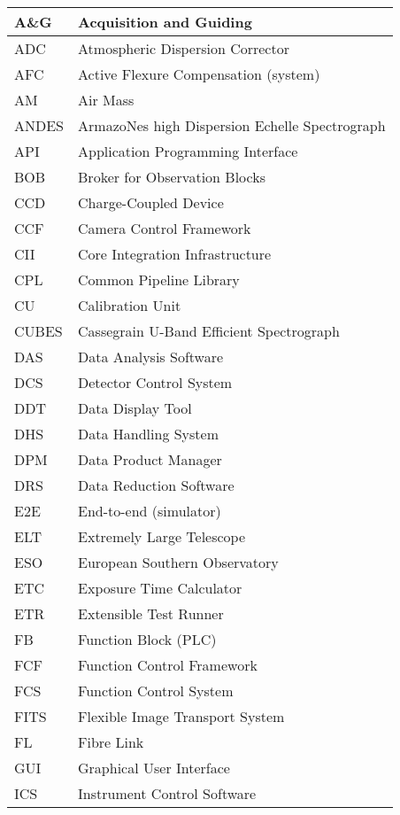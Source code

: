 \begin{longtable}{ |l|l| }
  \hline
A\&G & Acquisition and Guiding \\ \hline
ADC & Atmospheric Dispersion Corrector \\ \hline
AFC & Active Flexure Compensation (system) \\ \hline
AM & Air Mass \\ \hline
ANDES & ArmazoNes high Dispersion Echelle Spectrograph \\ \hline
API & Application Programming Interface \\ \hline
BOB & Broker for Observation Blocks \\ \hline
CCD & Charge-Coupled Device \\ \hline
CCF & Camera Control Framework \\ \hline
CII & Core Integration Infrastructure \\ \hline
CPL & Common Pipeline Library \\ \hline
CU & Calibration Unit \\ \hline
CUBES & Cassegrain U-Band Efficient Spectrograph \\ \hline
DAS & Data Analysis Software \\ \hline
DCS & Detector Control System \\ \hline
DDT & Data Display Tool \\ \hline
DHS & Data Handling System \\ \hline
DPM & Data Product Manager \\ \hline
DRS & Data Reduction Software \\ \hline
E2E & End-to-end (simulator) \\ \hline
ELT & Extremely Large Telescope \\ \hline
ESO & European Southern Observatory \\ \hline
ETC & Exposure Time Calculator \\ \hline
ETR & Extensible Test Runner \\ \hline
FB & Function Block (PLC) \\ \hline
FCF & Function Control Framework \\ \hline
FCS & Function Control System \\ \hline
FITS & Flexible Image Transport System \\ \hline
FL & Fibre Link \\ \hline
GUI & Graphical User Interface \\ \hline
ICS & Instrument Control Software \\ \hline

\end{longtable}
